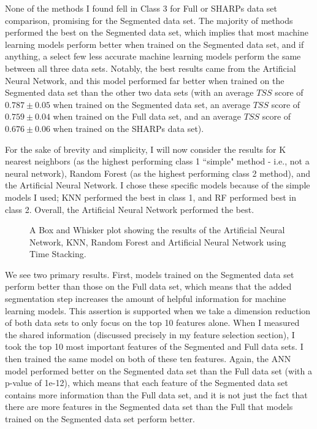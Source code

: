 None of the methods I found fell in Class 3 for Full or SHARPs data set comparison, promising for the Segmented data set. The majority of methods performed the best on the Segmented data set, which implies that most machine learning models perform better when trained on the Segmented data set, and if anything, a select few less accurate machine learning models perform the same between all three data sets. Notably, the best results came from the Artificial Neural Network, and this model performed far better when trained on the Segmented data set than the other two data sets (with an average $TSS$ score of $0.787 \pm 0.05$ when trained on the Segmented data set, an average $TSS$ score of $0.759 \pm 0.04$ when trained on the Full data set, and an average $TSS$ score of $0.676 \pm 0.06$ when trained on the SHARPs data set). 

For the sake of brevity and simplicity, I will now consider the results for K nearest neighbors (as the highest performing class 1 ``simple" method - i.e., not a neural network), Random Forest (as the highest performing class 2 method), and the Artificial Neural Network. I chose these specific models because of the simple models I used; KNN performed the best in class 1, and RF performed best in class 2. Overall, the Artificial Neural Network performed the best.
\begin{figure}[H]
    \centering
    \caption{A Box and Whisker plot showing the results of the Artificial Neural Network, KNN, Random Forest and Artificial Neural Network using Time Stacking.}
    \label{fig:resultsmethods}
\end{figure}

We see two primary results. First, models trained on the Segmented data set perform better than those on the Full data set, which means that the added segmentation step increases the amount of helpful information for machine learning models. This assertion is supported when we take a dimension reduction of both data sets to only focus on the top 10 features alone. When I measured the shared information (discussed precisely in my feature selection section), I took the top 10 most important features of the Segmented and Full data sets. I then trained the same model on both of these ten features. Again, the ANN model performed better on the Segmented data set than the Full data set (with a p-value of 1e-12), which means that each feature of the Segmented data set contains more information than the Full data set, and it is not just the fact that there are more features in the Segmented data set than the Full that models trained on the Segmented data set perform better.


